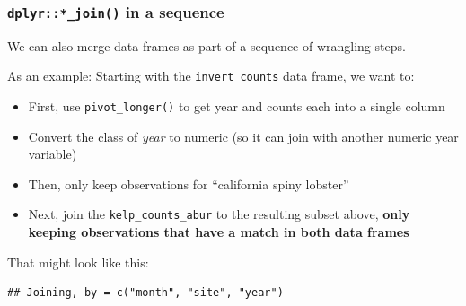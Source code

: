 \documentclass[]{book}
\newenvironment{Shaded}{\begin{snugshade}}{\end{snugshade}}
\newcommand{\DataTypeTok}[1]{\textcolor[rgb]{0.13,0.29,0.53}{#1}}
\newcommand{\KeywordTok}[1]{\textcolor[rgb]{0.13,0.29,0.53}{\textbf{#1}}}
\newcommand{\NormalTok}[1]{#1}
\newcommand{\OperatorTok}[1]{\textcolor[rgb]{0.81,0.36,0.00}{\textbf{#1}}}
\newcommand{\StringTok}[1]{\textcolor[rgb]{0.31,0.60,0.02}{#1}}
\providecommand{\tightlist}{%
  \setlength{\itemsep}{0pt}\setlength{\parskip}{0pt}}
\begin{document}
\hypertarget{dplyr_join-in-a-sequence}{%
\subsubsection{\texorpdfstring{\texttt{dplyr::*\_join()} in a sequence}{dplyr::*\_join() in a sequence}}\label{dplyr_join-in-a-sequence}}

We can also merge data frames as part of a sequence of wrangling steps.

As an example: Starting with the \texttt{invert\_counts} data frame, we want to:

\begin{itemize}
\tightlist
\item
  First, use \texttt{pivot\_longer()} to get year and counts each into a single column
\item
  Convert the class of \emph{year} to numeric (so it can join with another numeric year variable)
\item
  Then, only keep observations for ``california spiny lobster''
\item
  Next, join the \texttt{kelp\_counts\_abur} to the resulting subset above, \textbf{only keeping observations that have a match in both data frames}
\end{itemize}

That might look like this:

\begin{Shaded}
\end{Shaded}

\begin{verbatim}
## Joining, by = c("month", "site", "year")
\end{verbatim}
\end{document}
